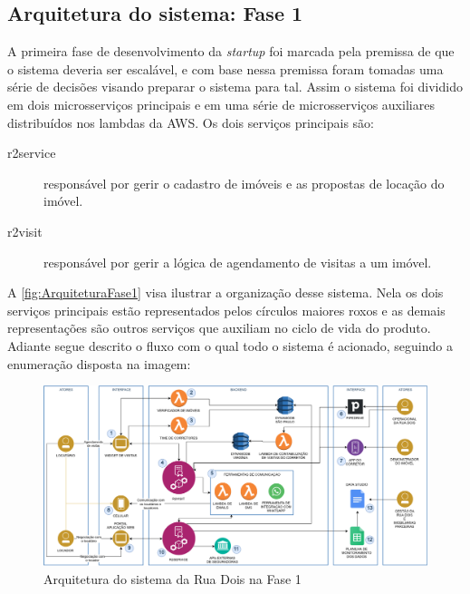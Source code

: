 \subsection{Arquitetura do sistema: Fase 1}
\label{sec:ArquiteturaFase1}

A primeira fase de desenvolvimento da \textit{startup} foi marcada pela premissa de
que o sistema deveria ser escalável, e com base nessa premissa foram tomadas uma
série de decisões visando preparar o sistema para tal. Assim o sistema foi dividido 
em dois microsserviços principais e em uma série de microsserviços auxiliares
distribuídos nos lambdas da \gls{AWS}. Os dois serviços principais são:

    \begin{description}
        \item [r2service] responsável por gerir o cadastro de imóveis e as propostas
        de locação do imóvel.
        \item [r2visit] responsável por gerir a lógica de agendamento de visitas
        a um imóvel.
    \end{description}

A \autoref{fig:ArquiteturaFase1} visa ilustrar a organização desse sistema. Nela
os dois serviços principais estão representados pelos círculos maiores roxos e as
demais representações são outros serviços que auxiliam no ciclo de vida do produto.
Adiante segue descrito o fluxo com o qual todo o sistema é acionado, seguindo a
enumeração disposta na imagem:

\begin{figure}[h]
  \centering
  \caption{Arquitetura do sistema da Rua Dois na Fase 1\label{fig:ArquiteturaFase1}}
  \includegraphics[keepaspectratio=true,scale=0.3]{figuras/r2ArquiteturaFase1.eps}
\end{figure}

